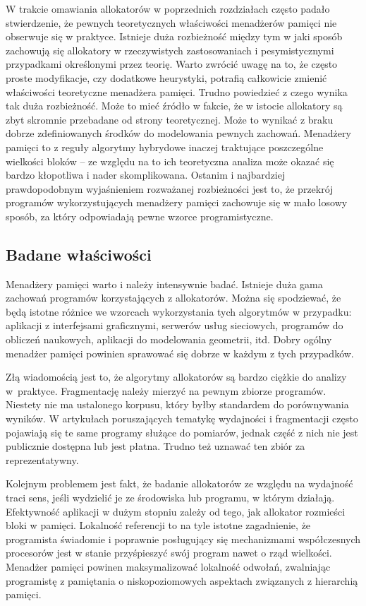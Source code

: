 \documentclass[12pt,a4paper,titlepage,twoside]{mwart}
\begin{document}
W trakcie omawiania allokatorów w poprzednich rozdziałach często padało
stwierdzenie, że pewnych teoretycznych właściwości menadżerów pamięci nie
obserwuje się w praktyce. Istnieje duża rozbieżność między tym w jaki sposób
zachowują się allokatory w rzeczywistych zastosowaniach i pesymistycznymi
przypadkami określonymi przez teorię. Warto zwrócić uwagę na to, że często
proste modyfikacje, czy dodatkowe heurystyki, potrafią całkowicie zmienić
właściwości teoretyczne menadżera pamięci. Trudno powiedzieć z czego wynika tak
duża rozbieżność. Może to mieć źródło w fakcie, że w istocie allokatory są zbyt
skromnie przebadane od strony teoretycznej. Może to wynikać z braku dobrze
zdefiniowanych środków do modelowania pewnych zachowań.  Menadżery pamięci to z
reguły algorytmy hybrydowe inaczej traktujące poszczególne wielkości bloków --
ze względu na to ich teoretyczna analiza może okazać się bardzo kłopotliwa i
nader skomplikowana. Ostanim i najbardziej prawdopodobnym wyjaśnieniem rozważanej
rozbieżności jest to, że przekrój programów wykorzystujących menadżery pamięci
zachowuje się w mało losowy sposób, za który odpowiadają pewne wzorce
programistyczne.

\subsection{Badane właściwości}

Menadżery pamięci warto i należy intensywnie badać. Istnieje duża gama zachowań
programów korzystających z allokatorów. Można się spodziewać, że będą istotne
różnice we wzorcach wykorzystania tych algorytmów w przypadku: aplikacji z
interfejsami graficznymi, serwerów usług sieciowych, programów do obliczeń
naukowych, aplikacji do modelowania geometrii, itd. Dobry ogólny menadżer
pamięci powinien sprawować się dobrze w każdym z tych przypadków.

Złą wiadomością jest to, że algorytmy allokatorów są bardzo ciężkie do analizy
w~praktyce. Fragmentację należy mierzyć na pewnym zbiorze programów. Niestety
nie ma ustalonego korpusu, który byłby standardem do porównywania wyników.  W
artykułach poruszających tematykę wydajności i fragmentacji często pojawiają
się te same programy służące do pomiarów, jednak część z nich nie jest
publicznie dostępna lub jest płatna. Trudno też uznawać ten zbiór za
reprezentatywny.

Kolejnym problemem jest fakt, że badanie allokatorów ze względu na wydajność
traci sens, jeśli wydzielić je ze środowiska lub programu, w którym działają.
Efektywność aplikacji w dużym stopniu zależy od tego, jak allokator rozmieści
bloki w pamięci. Lokalność referencji to na tyle istotne zagadnienie, że
programista świadomie i poprawnie posługujący się mechanizmami współczesnych
procesorów jest w stanie przyśpieszyć swój program nawet o rząd wielkości.
Menadżer pamięci powinen maksymalizować lokalność odwołań, zwalniając
programistę z pamiętania o niskopoziomowych aspektach związanych z hierarchią
pamięci.
\end{document}
